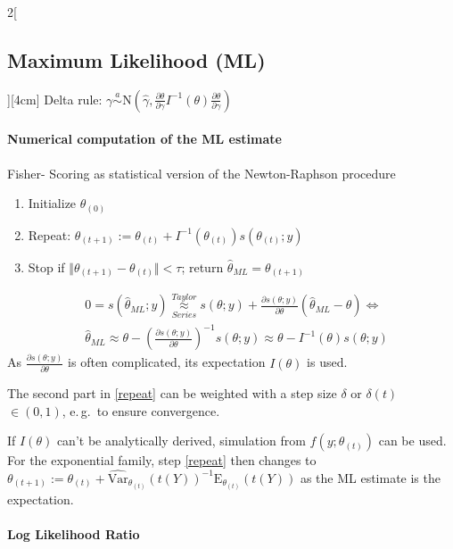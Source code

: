 \documentclass[8pt]{extarticle}
\begin{document}
\begin{multicols}{2}[\subsection{Maximum Likelihood (ML)}][4cm]
\noindent Delta rule: $\gamma \overset{a}{\sim} \mathrm{N}(\hat{\gamma}, \frac{\partial \theta}{\partial\gamma} I^{-1}(\theta) \frac{\partial \theta}{\partial\gamma} )$




\paragraph{Numerical computation of the ML estimate}
Fisher- Scoring as statistical version of the Newton-Raphson procedure

\begin{enumerate}
\item Initialize $\theta_{(0)}$
\item Repeat: $\theta_{(t+1)} := \theta_{(t)} + I^{-1}(\theta_{(t)})s(\theta_{(t)};y)$ \label{repeat}
\item Stop if $\Vert \theta_{(t+1)} -\theta_{(t)} \Vert < \tau$; return $\hat{\theta}_{ML}=\theta_{(t+1)}$
\end{enumerate}

\begin{Proof}
\vspace{-1.5em}
\begin{align*}
&0 = s(\hat{\theta}_{ML};y) \overset{Taylor}{\underset{Series}{\approx}} s(\theta;y) + \frac{\partial s(\theta;y)}{\partial \theta} (\hat{\theta}_{ML} - \theta) \Leftrightarrow \\
&\hat{\theta}_{ML} \approx \theta - \left(\frac{\partial s(\theta;y)}{\partial \theta}\right)^{-1} s(\theta;y) \approx \theta - I^{-1}(\theta)s(\theta;y)
\end{align*}
As $\frac{\partial s(\theta;y)}{\partial \theta}$ is often complicated, its expectation $I(\theta)$ is used.
\end{Proof}

\noindent The second part in \ref{repeat} can be weighted with a step size $\delta$ or $\delta(t)$ $\in (0,1)$, e.\,g.\ to ensure convergence.

\noindent If $I(\theta)$ can't be analytically derived, simulation from $f(y;\theta_{(t)})$ can be used. For the exponential family, step \ref{repeat} then changes to $\theta_{(t+1)} := \theta_{(t)} + \hat{\mathrm{Var}}_{\theta_{(t)}}(t(Y))^{-1} \mathrm{E}_{\theta_{(t)}}(t(Y))$ as the ML estimate is the expectation.

\paragraph{Log Likelihood Ratio}


\end{multicols}
\end{document}
